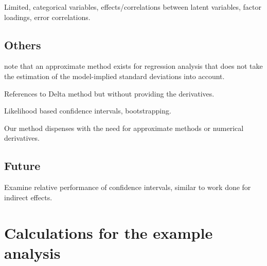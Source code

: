 \documentclass[a4paper, 11pt]{article}
\newcommand{\0}{\boldsymbol{0}}
\begin{document}
Limited, categorical variables, effects/correlations between latent variables,
factor loadings, error correlations.

\subsection{Others}
\cite{bollen1990direct} note that an approximate method exists for regression
analysis that does not take the estimation of the model-implied standard
deviations into account. 

References to Delta method but without providing the derivatives.

Likelihood based confidence intervals, bootstrapping.

Our method dispenses with the need for approximate methods or numerical
derivatives.

\subsection{Future}

Examine relative performance of confidence intervals, similar to work done for
indirect effects.





\appendix

\section{Calculations for the example analysis}
\end{document}
